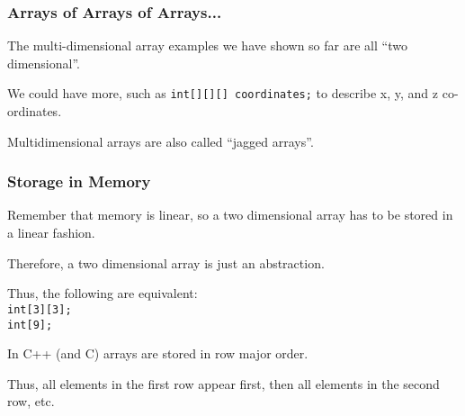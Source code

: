 \begin{frame}
\frametitle{Arrays of Arrays of Arrays...}

The multi-dimensional array examples we have shown so far are all ``two dimensional''.

We could have more, such as \texttt{int[][][] coordinates;} to describe x, y, and z co-ordinates.

Multidimensional arrays are also called ``\alert{jagged} arrays''.

\end{frame}



\begin{frame}
\frametitle{Storage in Memory}

Remember that memory is linear, so a two dimensional array has to be stored in a linear fashion.

Therefore, a two dimensional array is just an abstraction. 

Thus, the following are equivalent:\\
\quad \texttt{int[3][3];}\\
\quad \texttt{int[9];}



In C++ (and C) arrays are stored in \alert{row major} order.

Thus, all elements in the first row appear first, then all elements in the second row, etc.




\end{frame}



